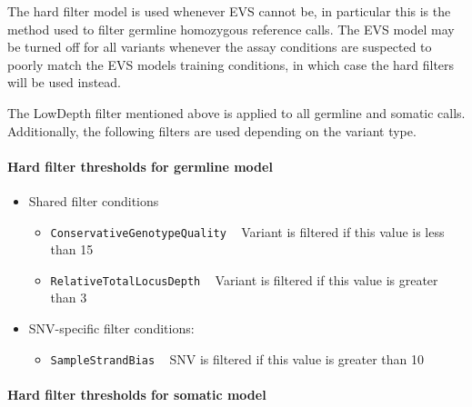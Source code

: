 \documentclass{article}
\begin{document}
The hard filter model is used whenever EVS cannot be, in particular this is the method used to filter germline homozygous reference calls. The EVS model may be turned off for all variants whenever the assay conditions are suspected to poorly match the EVS models training conditions, in which case the hard filters will be used instead.

The LowDepth filter mentioned above is applied to all germline and somatic calls. Additionally, the following filters are used depending on the variant type.

\paragraph{Hard filter thresholds for germline model}

\begin{itemize}
    \item Shared filter conditions
    \begin{itemize}
        \item \texttt{ConservativeGenotypeQuality} ~ Variant is filtered if this value is less than 15
        \item \texttt{RelativeTotalLocusDepth} ~ Variant is filtered if this value is greater than 3
    \end{itemize}
    \item SNV-specific filter conditions:
    \begin{itemize}
        \item \texttt{SampleStrandBias} ~ SNV is filtered if this value is greater than 10
    \end{itemize}
\end{itemize}

\paragraph{Hard filter thresholds for somatic model}
\end{document}
